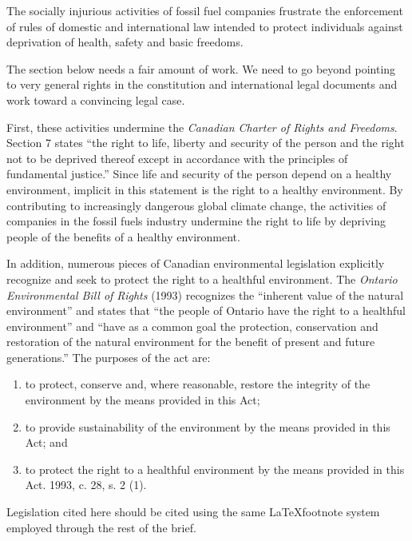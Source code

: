 The socially injurious activities of fossil fuel companies frustrate the enforcement of rules of domestic and international law intended to protect individuals against deprivation of health, safety and basic freedoms.  



\begin{vcom}
	The section below needs a fair amount of work. We need to go beyond pointing to very general rights in the constitution and international legal documents and work toward a convincing legal case.
\end{vcom}



First, these activities undermine the \emph{Canadian Charter of Rights and Freedoms}.  
Section 7 states ``the right to life, liberty and security of the person and the right not to be deprived thereof except in accordance with the principles of fundamental justice.''   
Since life and security of the person depend on a healthy environment, implicit in this statement is the right to a healthy environment.  
By contributing to increasingly dangerous global climate change, the activities of companies in the fossil fuels industry undermine the right to life by depriving people of the benefits of a healthy environment.  



In addition, numerous pieces of Canadian environmental legislation explicitly recognize and seek to protect the right to a healthful environment.
The \emph{Ontario Environmental Bill of Rights} (1993) recognizes the ``inherent value of the natural environment'' and states that ``the people of Ontario have the right to a healthful environment'' and ``have as a common goal the protection, conservation and restoration of the natural environment for the benefit of present and future generations.''  
The purposes of the act are:
\begin{enumerate}
	\item to protect, conserve and, where reasonable, restore the integrity of the environment by the means provided in this Act;
	\item to provide sustainability of the environment by the means provided in this Act; and
	\item to protect the right to a healthful environment by the means provided in this Act.  1993, c. 28, s. 2 (1).
\end{enumerate}

\begin{vcom}
	Legislation cited here should be cited using the same \LaTeX footnote system employed through the rest of the brief.
\end{vcom}


